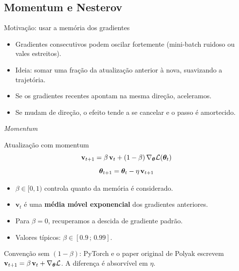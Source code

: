 \documentclass[aspectratio=169,xcolor=dvipsnames]{beamer}
\begin{document}
  \subsection{Momentum e Nesterov}

  \begin{frame}{Motivação: usar a memória dos gradientes}
    \begin{itemize}
      \item Gradientes consecutivos podem oscilar fortemente (mini-batch ruidoso ou vales estreitos).
      \item Ideia: somar uma fração da atualização anterior à nova, suavizando a trajetória.
      \item Se os gradientes recentes apontam na mesma direção, aceleramos.
      \item Se mudam de direção, o efeito tende a se cancelar e o passo é amortecido.
    \end{itemize}
  \end{frame}

  \begin{frame}{\textit{Momentum}}
    \begin{block}{Atualização com momentum}
      \[
        \mathbf{v}_{t+1} = \beta\,\mathbf{v}_{t} + (1-\beta)\,\nabla_{\bm{\theta}}\mathcal{L}(\bm{\theta}_{t})
      \]
      \[
        \bm{\theta}_{t+1} = \bm{\theta}_{t} - \eta\,\mathbf{v}_{t+1}
      \]
    \end{block}
    \begin{itemize}
      \item $\beta\in[0,1)$ controla quanto da memória é considerado.
      \item $\mathbf{v}_t$ é uma \textbf{média móvel exponencial} dos gradientes anteriores.
      \item Para $\beta=0$, recuperamos a descida de gradiente padrão.
      \item Valores típicos: $\beta\in[0.9\,;\,0.99]$.
    \end{itemize}
    \vspace{0.4em}
    {\footnotesize\color{gray!50!black}Convenção sem $(1-\beta)$: PyTorch e o paper original de Polyak escrevem $\mathbf{v}_{t+1} = \beta\,\mathbf{v}_t + \nabla_{\bm{\theta}}\mathcal{L}$. A diferença é absorvível em $\eta$.}
  \end{frame}
\end{document}
